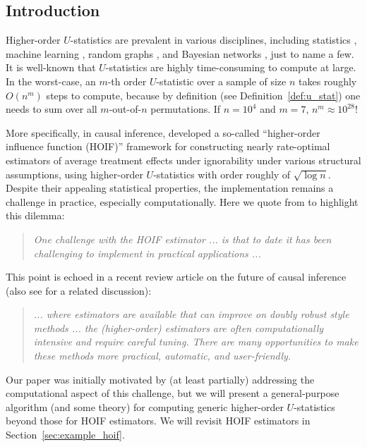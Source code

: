\documentclass[12pt]{article}
\theoremstyle{plain}
\theoremstyle{definition}
\begin{document}
\begin{bibunit}[agsm]

\setcounter{page}{1}

\section{Introduction}
\label{sec:intro}
Higher-order $U$-statistics are prevalent in various disciplines, including statistics \citep{robins2008higher, bonvini2022fast, bonvini2024doubly, yao2018testing, breunig2024adaptive, shao2025u}, machine learning \citep{clemenccon2008ranking, clemenccon2013maximal}, random graphs \citep{chatterjee2024higher}, and Bayesian networks \citep{shpitser2011efficient}, just to name a few. It is well-known that $U$-statistics are highly time-consuming to compute at large. In the worst-case, an $m$-th order $U$-statistic over a sample of size $n$ takes roughly $O (n^{m})$ steps to compute, because by definition (see Definition~\ref{def:u_stat}) one needs to sum over all $m$-out-of-$n$ permutations. If $n = 10^{4}$ and $m = 7$, $n^{m} \approx 10^{28}$! 

More specifically, in causal inference, \citet{robins2008higher} developed a so-called ``higher-order influence function (HOIF)'' framework for constructing nearly rate-optimal estimators of average treatment effects under ignorability under various structural assumptions, using higher-order $U$-statistics with order roughly of $\sqrt{\log n}$. Despite their appealing statistical properties, the implementation remains a challenge in practice, especially computationally. Here we quote from \citet{wager2024causal} to highlight this dilemma:
\begin{quote}
\emph{One challenge with the HOIF estimator ... is that to date it has been challenging to implement in practical applications ...}
\end{quote}
This point is echoed in a recent review article on the future of causal inference \citep{cinelli2025challenges} (also see \citet{zheng2025perturbed} for a related discussion):
\begin{quote}
\emph{... where estimators are available that can improve on doubly robust style methods ... the (higher-order) estimators are often computationally intensive and require careful tuning. There are many opportunities to make these methods more practical, automatic, and user-friendly.}
\end{quote}

Our paper was initially motivated by (at least partially) addressing the computational aspect of this challenge, but we will present a general-purpose algorithm (and some theory) for computing generic higher-order $U$-statistics beyond those for HOIF estimators. We will revisit HOIF estimators in Section~\ref{sec:example_hoif}. 


\end{bibunit}
\end{document}
